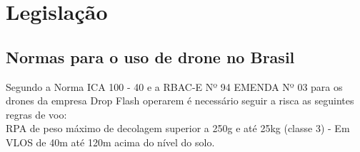 \chapter{Legislação}
\label{ch:identificador}

\section{Normas para o uso de drone no Brasil}

Segundo a Norma ICA 100 - 40 \cite{(ICA100)} e a RBAC-E Nº 94 EMENDA Nº 03 \cite{(RBAC-E)} para os drones da empresa Drop Flash operarem é necessário seguir a risca as seguintes regras de voo:\\

RPA de peso máximo de decolagem superior a 250g e até 25kg (classe 3) - Em VLOS de 40m até 120m acima do nível do solo. 

